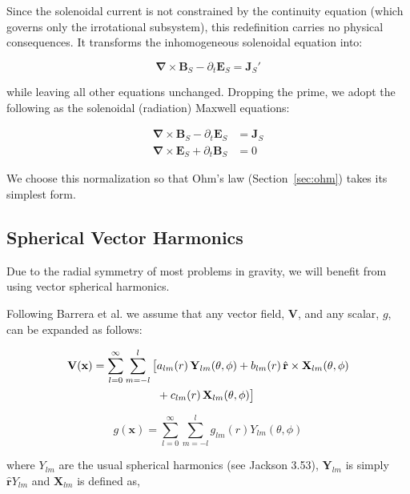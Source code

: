 \documentclass {article}
\renewcommand\vec{\mathbf}
\let\OldS\nabla
\renewcommand{\nabla}{\boldsymbol{\OldS}}
\let\OldHat\hat
\renewcommand{\hat}[1]{\OldHat{\mathbf{#1}}}
\begin{document}
\noindent Since the solenoidal current is not constrained by the continuity equation (which governs only the irrotational subsystem), this redefinition carries no physical consequences. It transforms the inhomogeneous solenoidal equation into:

\begin{equation}
\nabla \times \vec{B}_S - \partial_t \vec{E}_S = \vec{J}_S'
\end{equation}

\noindent while leaving all other equations unchanged. Dropping the prime, we adopt the following as the solenoidal (radiation) Maxwell equations:

\begin{equation}
\begin{aligned}
\nabla \times \vec{B}_S - \partial_t \vec{E}_S &= \vec{J}_S \\
\nabla \times \vec{E}_S + \partial_t \vec{B}_S &= 0
\end{aligned}
\end{equation}

\noindent We choose this normalization so that Ohm's law (Section~\ref{sec:ohm}) takes its simplest form.


\subsection{Spherical Vector Harmonics}

Due to the radial symmetry of most problems in gravity, we will benefit from using vector spherical harmonics.

Following Barrera et al. \cite{barrera1985} we assume that any vector field, $\vec V$, and any scalar, $g$, can be expanded as follows:



\begin{align}
\vec{V}(\vec{x}) = \sum_{l=0}^{\infty} \sum_{m=-l}^{l} \big[ 
& a_{lm}(r)\, \vec{Y}_{lm}(\theta, \phi) 
+ b_{lm}(r)\, \hat{r} \times \vec{X}_{lm}(\theta, \phi) \notag \\
& + c_{lm}(r)\, \vec{X}_{lm}(\theta, \phi) 
\big]
\end{align}

\begin{equation}
g(\vec x) = \sum_{l=0}^{\infty} \sum_{m=-l}^{l} g_{lm}(r) Y_{lm}(\theta, \phi)
\end{equation}


\noindent where $Y_{lm}$ are the usual spherical harmonics (see Jackson 3.53), $\vec Y_{lm}$ is simply $\hat r Y_{lm}$  and $\vec X_{lm}$ is defined as,
\end{document}
